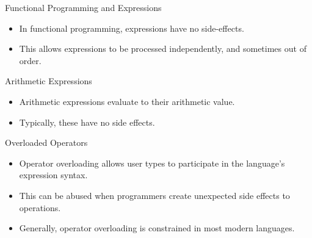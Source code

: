 \documentclass[handout]{beamer}
\newenvironment{code}{%
 \VerbatimEnvironment
 \begin{adjustbox}{max width=\textwidth, max height=0.7\textheight}
 \begin{BVerbatim}
  }{
  \end{BVerbatim}
 \end{adjustbox}
}
\begin{document}

\begin{frame}{Functional Programming and Expressions}
    \begin{itemize}
        \item In functional programming, expressions have no side-effects.
        \item This allows expressions to be processed independently, and sometimes out of order.
    \end{itemize}
\end{frame}

\begin{frame}{Arithmetic Expressions}
    \begin{itemize}
        \item Arithmetic expressions evaluate to their arithmetic value.
        \item Typically, these have no side effects.
    \end{itemize}
\end{frame}

\begin{frame}{Overloaded Operators}
    \begin{itemize}
        \item Operator overloading allows user types to participate in the language's expression syntax.
        \item This can be abused when programmers create unexpected side effects to operations.
        \item Generally, operator overloading is constrained in most modern languages.
    \end{itemize}
\end{frame}

\end{document}
